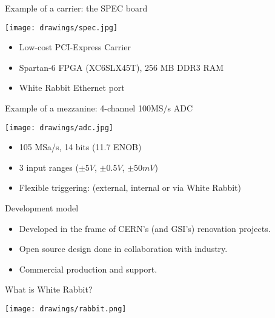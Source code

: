 \documentclass[compress,red]{beamer}
\begin{document}
\begin{frame}{Example of a carrier: the SPEC board}
\begin{center}
\texttt{[image: drawings/spec.jpg]}
\begin{itemize}
\item Low-cost PCI-Express Carrier
\item Spartan-6 FPGA (XC6SLX45T), 256 MB DDR3 RAM
\item White Rabbit Ethernet port
\end{itemize}
\end{center}
\end{frame}

\begin{frame}{Example of a mezzanine: 4-channel 100MS/s ADC}
\begin{center}
\texttt{[image: drawings/adc.jpg]}
\begin{itemize}
\item 105 MSa/s, 14 bits (11.7 ENOB)
\item 3 input ranges ($\pm5V$, $\pm0.5V$, $\pm50mV$)
\item Flexible triggering: (external, internal or via White Rabbit)
\end{itemize}
\end{center}
\end{frame}




\begin{frame}{Development model}
\begin{itemize}
\item Developed in the frame of CERN's (and GSI's) renovation projects.
\item Open source design done in collaboration with industry.
\item Commercial production and support.
\end{itemize}
\end{frame}

\begin{frame}{What is White Rabbit?}
\begin{center}
\texttt{[image: drawings/rabbit.png]}
\end{center}
\end{frame}
\end{document}
